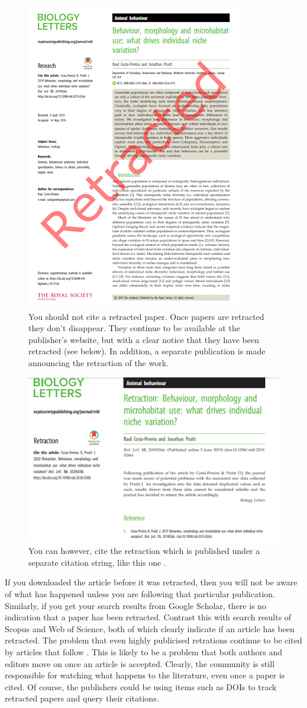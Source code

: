 \documentclass[
]{krantz}
\begin{document}
\begin{figure}
\includegraphics[width=0.5\linewidth]{figures/retracted1} \caption{You should not cite a retracted paper. Once papers are retracted they don't disappear. They continue to be available at the publisher's website, but with a clear notice that they have been retracted (see below). In addition, a separate publication is made announcing the retraction of the work.}\label{fig:retraction1}
\end{figure}



\begin{figure}
\includegraphics[width=0.5\linewidth]{figures/retracted2} \caption{You can however, cite the retraction which is published under a separate citation string, like this one \citep{costa-pereira2020retraction}.}\label{fig:retraction2}
\end{figure}

If you downloaded the article before it was retracted, then you will not be aware of what has happened unless you are following that particular publication. Similarly, if you get your search results from Google Scholar, there is no indication that a paper has been retracted. Contrast this with search results of Scopus and Web of Science, both of which clearly indicate if an article has been retracted. The problem that even highly publicised retrations continue to be cited by articles that follow \citep{piller2021disgraced}. This is likely to be a problem that both authors and editors move on once an article is accepted. Clearly, the community is still responsible for watching what happens to the literature, even once a paper is cited. Of course, the publishers could be using items such as DOIs to track retracted papers and query their citations.
\end{document}

